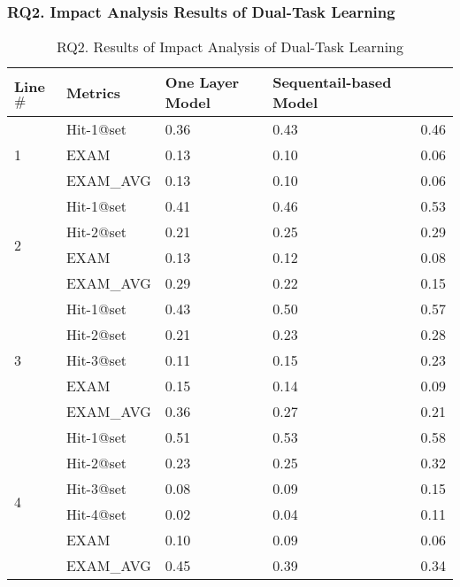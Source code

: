 \subsubsection{\bf RQ2. Impact Analysis Results of Dual-Task Learning}

\iffalse

\begin{table}[b]
	\caption{RQ2. Results of Impact Analysis of Dual-Task Learning}
        \vspace{-12pt}
	{\footnotesize
		\begin{center}
			\renewcommand{\arraystretch}{1}
			\begin{tabular}{p{1cm}<{\centering}|p{1.5cm}<{\centering}|p{1.5cm}<{\centering}|p{1.5cm}<{\centering}|p{1.2cm}<{\centering}}
				\hline
				Line$\#$ & Metrics & One Layer Model & Sequentail-based Model & \tool \\
				\hline
				\multirow{3}{*}{1}  & Hit-1@set     & 0.36 & 0.43 & 0.46  \\
									& EXAM          & 0.13 & 0.10 & 0.06  \\
									& EXAM\_AVG     & 0.13 & 0.10 & 0.06  \\
				\hline
				\multirow{4}{*}{2}  & Hit-1@set     & 0.41 & 0.46 & 0.53  \\
									& Hit-2@set     & 0.21 & 0.25 & 0.29  \\
									& EXAM          & 0.13 & 0.12 & 0.08  \\
									& EXAM\_AVG     & 0.29 & 0.22 & 0.15 \\
				\hline
				\multirow{5}{*}{3}  & Hit-1@set     & 0.43 & 0.50 & 0.57 \\
									& Hit-2@set     & 0.21 & 0.23 & 0.28 \\
									& Hit-3@set     & 0.11 & 0.15 & 0.23 \\
									& EXAM          & 0.15 & 0.14 & 0.09 \\
									& EXAM\_AVG     & 0.36 & 0.27 & 0.21 \\
				\hline
				\multirow{6}{*}{4}  & Hit-1@set     & 0.51 & 0.53 & 0.58 \\
									& Hit-2@set     & 0.23 & 0.25 & 0.32 \\
									& Hit-3@set     & 0.08 & 0.09 & 0.15 \\
									& Hit-4@set     & 0.02 & 0.04 & 0.11 \\
									& EXAM          & 0.10 & 0.09 & 0.06 \\
									& EXAM\_AVG     & 0.45 & 0.39 & 0.34 \\

\end{tabular}
\end{center}}
\end{table}
